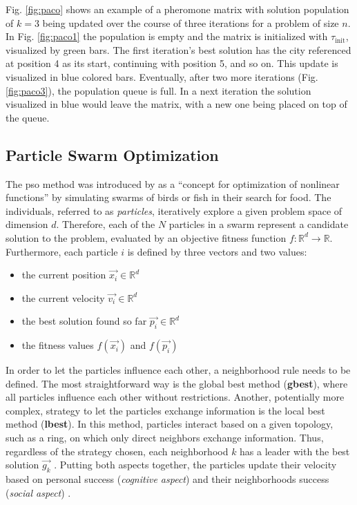Fig. \ref{fig:paco} shows an example of a pheromone matrix with solution population of $k=3$ being updated over the course of three iterations for a problem of size $n$. In Fig. \ref{fig:paco1} the population is empty and the matrix is initialized with $\tau_{\text{init}}$, visualized by green bars. The first iteration's best solution has the city referenced at position 4 as its start, continuing with position 5, and so on. This update is visualized in blue colored bars. Eventually, after two more iterations (Fig. \ref{fig:paco3}), the population queue is full. In a next iteration the solution visualized in blue would leave the matrix, with a new one being placed on top of the queue.

\subsection{Particle Swarm Optimization}

The \gls{pso} method was introduced by \citet{kennedy1995particle} as a \enquote{concept for optimization of nonlinear functions} by simulating swarms of birds or fish in their search for food. The individuals, referred to as \textit{particles}, iteratively explore a given problem space of dimension $d$. Therefore, each of the $N$ particles in a swarm represent a candidate solution to the problem, evaluated by an objective fitness function $f: \mathbb{R}^d \to \mathbb{R}$. Furthermore, each particle $i$ is defined by three vectors and two values:
\begin{itemize}
	\item the current position $\vec{x_i} \in \mathbb{R}^d$ 
	\item the current velocity $\vec{v_i} \in \mathbb{R}^d$ 
	\item the best solution found so far $\vec{p_i} \in \mathbb{R}^d$
	\item the fitness values $f(\vec{x_i})$ and $f(\vec{p_i})$
\end{itemize}

In order to let the particles influence each other, a neighborhood rule needs to be defined. The most straightforward way is the global best method (\textbf{gbest}), where all particles influence each other without restrictions. Another, potentially more complex, strategy to let the particles exchange information is the local best method (\textbf{lbest}). In this method, particles interact based on a given topology, such as a ring, on which only direct neighbors exchange information. Thus, regardless of the strategy chosen, each neighborhood $k$ has a leader with the best solution $\vec{g_k}$ \cite{talbi2009metaheuristics}. Putting both aspects together, the particles update their velocity based on personal success (\textit{cognitive aspect}) and their neighborhoods success (\textit{social aspect}) \cite{janson2003hierarchical}. 

